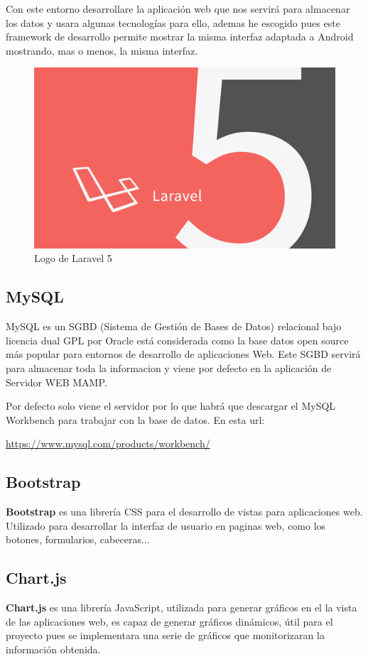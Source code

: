Con este entorno desarrollare la aplicación web que nos servirá para almacenar los datos y usara algunas tecnologías para ello, ademas he escogido pues este framework de desarrollo permite mostrar la misma interfaz adaptada a Android mostrando, mas o menos, la misma interfaz.

\begin{figure}[!h]
\centering
\includegraphics[width=0.3\linewidth]{figuras/laralogo}
\caption{Logo de Laravel 5}
\label{fig:laralogo}
\end{figure}


\subsection{MySQL}

\setlength{\parindent}{5ex}MySQL es un SGBD (Sistema de Gestión de Bases de Datos)  relacional bajo licencia dual GPL por Oracle está considerada como la base datos open source más popular para entornos de desarrollo de aplicaciones Web. Este SGBD servirá para almacenar toda la informacion y viene por defecto en la aplicación de Servidor WEB MAMP.

Por defecto solo viene el servidor por lo que habrá que descargar el MySQL Workbench para trabajar con la base de datos. En esta url:

\url{https://www.mysql.com/products/workbench/}

\subsection{Bootstrap}

\textbf{Bootstrap} es una librería  CSS para el desarrollo de vistas para aplicaciones web. Utilizado para desarrollar la interfaz de usuario en paginas web, como los botones, formularios, cabeceras...

\subsection{Chart.js}

\textbf{Chart.js} es una librería JavaScript, utilizada para generar gráficos en el la vista de las aplicaciones web, es capaz de generar gráficos dinámicos, útil para el proyecto pues se implementara una serie de gráficos que monitorizaran la información obtenida.



